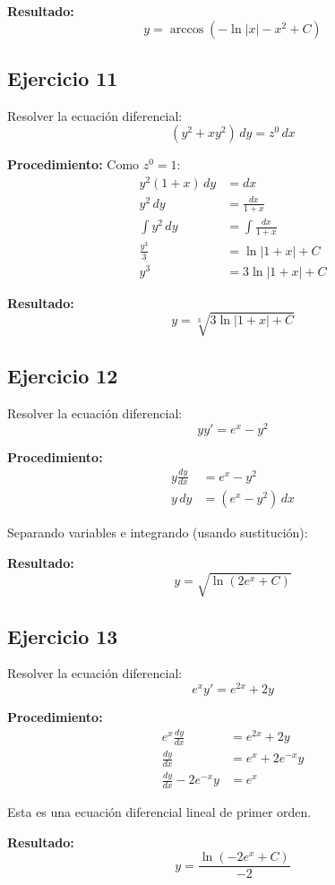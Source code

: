 \documentclass[12pt]{article}
\begin{document}
\textbf{Resultado:}
\[
y = \arccos(-\ln|x| - x^2 + C)
\]

\subsection*{Ejercicio 11}
Resolver la ecuación diferencial:
\[
(y^2 + xy^2)\,dy = z^0\,dx
\]

\textbf{Procedimiento:}
Como $z^0 = 1$:
\begin{align*}
y^2(1 + x)\,dy &= dx \\
y^2\,dy &= \frac{dx}{1+x} \\
\int y^2\,dy &= \int \frac{dx}{1+x} \\
\frac{y^3}{3} &= \ln|1+x| + C \\
y^3 &= 3\ln|1+x| + C
\end{align*}

\textbf{Resultado:}
\[
y = \sqrt[3]{3\ln|1+x| + C}
\]

\subsection*{Ejercicio 12}
Resolver la ecuación diferencial:
\[
yy' = e^x - y^2
\]

\textbf{Procedimiento:}
\begin{align*}
y\frac{dy}{dx} &= e^x - y^2 \\
y\,dy &= (e^x - y^2)\,dx
\end{align*}

Separando variables e integrando (usando sustitución):

\textbf{Resultado:}
\[
y = \sqrt{\ln(2e^x + C)}
\]

\subsection*{Ejercicio 13}
Resolver la ecuación diferencial:
\[
e^x y' = e^{2x} + 2y
\]

\textbf{Procedimiento:}
\begin{align*}
e^x \frac{dy}{dx} &= e^{2x} + 2y \\
\frac{dy}{dx} &= e^x + 2e^{-x}y \\
\frac{dy}{dx} - 2e^{-x}y &= e^x
\end{align*}

Esta es una ecuación diferencial lineal de primer orden.

\textbf{Resultado:}
\[
y = \frac{\ln(-2e^x + C)}{-2}
\]
\end{document}
